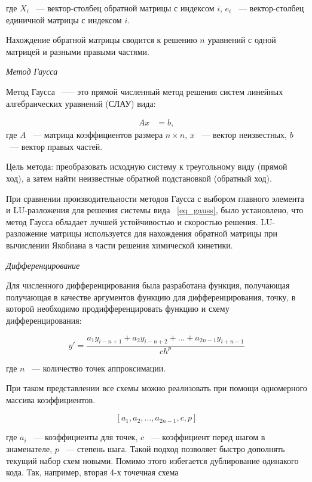 где $X_i$ ~--- вектор-столбец обратной матрицы с индексом $i$, $e_i$ ~--- вектор-столбец единичной матрицы с индексом $i$.

Нахождение обратной матрицы сводится к решению $n$ уравнений с одной матрицей и разными правыми частями.

\textit{Метод Гаусса}

Метод Гаусса ~--— это прямой численный метод решения систем линейных алгебраических уравнений (СЛАУ) вида:

\begin{equation}
\begin{split}
Ax &= b,
\end{split}
\label{eq_gauss}
\end{equation}
где $A$ ~--- матрица коэффициентов размера $n \times n$, $x$ ~--- вектор неизвестных, $b$ ~--- вектор правых частей.

Цель метода: преобразовать исходную систему к треугольному виду (прямой ход), а затем найти неизвестные обратной подстановкой (обратный ход).

При сравнении производительности методов Гаусса с выбором главного элемента и LU-разложения для решения системы вида ~\ref{eq_gauss}, было установлено, что метод Гаусса обладает лучшей устойчивостью и скоростью решения. LU-разложение матрицы используется для нахождения обратной матрицы при вычислении Якобиана в части решения химической кинетики.

\textit{Дифференцирование}

Для численного дифференцирования была разработана функция, получающая  получающая в качестве аргументов функцию для дифференцирования,
точку, в которой необходимо продифференцировать функцию и схему дифференцирования:

\begin{equation}
    y' = \frac{a_1y_{i-n+1} + a_2y_{i-n+2} + ... + a_{2n-1}y_{i+n-1}}{ch^p}
    \label{eq:DiffCommon}
\end{equation}

где $n$ ~--- количество точек аппроксимации.

При таком представлении все схемы можно реализовать при помощи одномерного массива коэффициентов.

$$
[a_1, a_2, ..., a_{2n - 1}, c, p]
$$

где $a_i$ ~--- коэффициенты для точек, $c$ ~--- коэффициент перед шагом в знаменателе, $p$ ~--- степень шага. Такой подход позволяет
быстро дополнять текущий набор схем новыми. Помимо этого избегается дублирование одинакого кода.
Так, например, вторая 4-х точечная схема 


